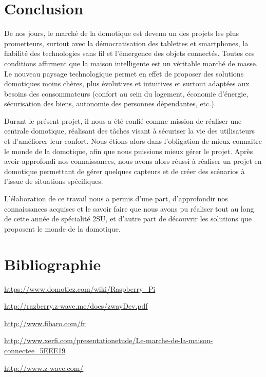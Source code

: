 \newpage
\clearpage
\chapter{Conclusion}
De nos jours, le marché de la domotique est devenu un des projets les plus prometteurs, surtout avec la démocratisation des tablettes et smartphones, la fiabilité des technologies sans fil et l'émergence des objets connectés. Toutes ces conditions affirment que la maison intelligente est un véritable marché de masse. Le nouveau paysage technologique permet en effet de proposer des solutions domotiques moins chères, plus évolutives et intuitives et surtout adaptées aux besoins des consommateurs (confort au sein du logement, économie d'énergie, sécurisation des biens, autonomie des personnes dépendantes, etc.).\newline

Durant le présent projet, il nous a été confié comme mission de réaliser une centrale domotique, réalisant des tâches visant à sécuriser la vie des utilisateurs et d'améliorer leur confort. Nous étions alors dans l'obligation de mieux connaitre le monde de la domotique, afin que nous puissions mieux gérer le projet.
Après avoir approfondi nos connaissances, nous avons alors réussi à réaliser un projet en domotique permettant de gérer quelques capteurs et de créer des scénarios à l'issue de situations spécifiques.\newline

L'élaboration de ce travail nous a permis d'une part, d'approfondir nos connaissances acquises et le savoir faire que nous avons pu réaliser tout au long de cette année de spécialité 2SU, et d'autre part de découvrir les solutions que proposent le monde de la domotique.\newline
\clearpage

\newpage
\chapter{Bibliographie}
{
\center

\url{https://www.domoticz.com/wiki/Raspberry\_Pi}

\url{http://razberry.z-wave.me/docs/zwayDev.pdf}

\url{http://www.fibaro.com/fr}

\url{http://www.xerfi.com/presentationetude/Le-marche-de-la-maison-connectee\_5EEE19}

\url{http://www.z-wave.com/}
}

